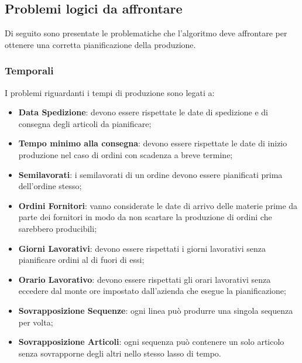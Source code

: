 \subsection{Problemi logici da affrontare}
Di seguito sono presentate le problematiche che l'algoritmo deve affrontare per ottenere una corretta pianificazione della produzione.

\subsubsection{Temporali}
I problemi riguardanti i tempi di produzione sono legati a:
\begin{itemize}
	\item \textbf{Data Spedizione}: devono essere rispettate le date di spedizione e di consegna degli articoli da pianificare;
	\item \textbf{Tempo minimo alla consegna}: devono essere rispettate le date di inizio produzione nel caso di ordini con scadenza a breve termine;
	
	\item \textbf{Semilavorati}: i semilavorati di un ordine devono essere pianificati prima dell'ordine stesso;
	
	\item \textbf{Ordini Fornitori}: vanno considerate le date di arrivo delle materie prime da parte dei fornitori in modo da non scartare la produzione di ordini che sarebbero producibili;
	
	\item \textbf{Giorni Lavorativi}: devono essere rispettati i giorni lavorativi senza pianificare ordini al di fuori di essi;
	\item \textbf{Orario Lavorativo}: devono essere rispettati gli orari lavorativi senza eccedere dal monte ore impostato dall'azienda che esegue la pianificazione;
	\item \textbf{Sovrapposizione Sequenze}: ogni linea può produrre una singola sequenza per volta;	
	\item \textbf{Sovrapposizione Articoli}: ogni sequenza può contenere un solo articolo senza sovrapporne degli altri nello stesso lasso di tempo.
\end{itemize}

